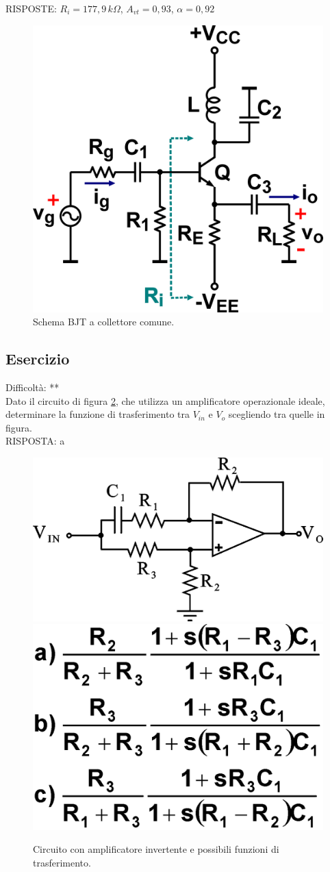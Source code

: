 \documentclass[a4paper,portrait,12pt]{article}
\theoremstyle{definition}
\begin{document}
RISPOSTE: $R_i = 177,9\,k\Omega$, $A_{vt} = 0,93$, $\alpha = 0,92$

\begin{figure}[H]
\centering
\includegraphics[width=.5\linewidth]{img/elettronicaEs/CC.pdf}
\caption{Schema BJT a collettore comune.}
\label{img:CC}
\end{figure}


\subsection{Esercizio}

Difficoltà: **\\

Dato il circuito di figura \ref{img:trasferimento}, che utilizza un amplificatore operazionale ideale, 
determinare la funzione di trasferimento tra $V_{in}$ e $V_o$ scegliendo tra quelle in figura.\\

RISPOSTA: a

\begin{figure}[H]
\centering
\includegraphics[width=.3\linewidth]{img/elettronicaEs/ampli.pdf}
\includegraphics[width=.3\linewidth]{img/elettronicaEs/trasferimento.pdf}
\caption{Circuito con amplificatore invertente e possibili funzioni di trasferimento.}
\label{img:trasferimento}
\end{figure}
\end{document}
